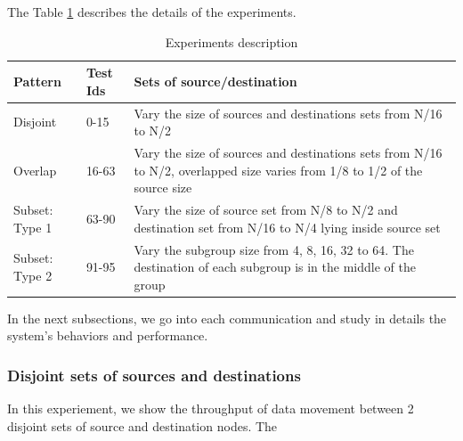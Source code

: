 The Table \ref{tbl:experiment} describes the details of the experiments.

\begin{table}[h]
\begin{center}
    \begin{tabular}{ | p{1cm} | l | p{5cm} |}
    \hline
    Pattern & Test Ids & Sets of source/destination \\ \hline
    Disjoint & 0-15 & Vary the size of sources and destinations sets from N/16 to N/2 \\ \hline
    Overlap & 16-63 & Vary the size of sources and destinations sets from N/16 to N/2, overlapped size varies from 1/8 to 1/2 of the source size \\ \hline
    Subset: Type 1 & 63-90 & Vary the size of source set from N/8 to N/2 and destination set from N/16 to N/4 lying inside source set \\ \hline
    Subset: Type 2 & 91-95 & Vary the subgroup size from 4, 8, 16, 32 to 64. The destination of each subgroup is in the middle of the group \\
    \hline
    \end{tabular}

    \caption{Experiments description}
    \label{tbl:experiment}

\end{center}
\end{table}

In the next subsections, we go into each communication and study in details the system's behaviors and performance.

\subsubsection{Disjoint sets of sources and destinations}

In this experiement, we show the throughput of data movement between 2 disjoint sets of source and destination nodes. The 


